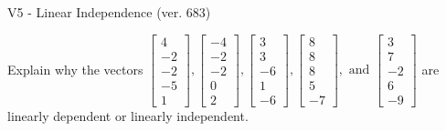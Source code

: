 \begin{exercise}
  \begin{exerciseTitle}V5 - Linear Independence (ver. 683)\end{exerciseTitle}
  \begin{exerciseStatement}
    Explain why the vectors \(\left[\begin{array}{r}
4 \\
-2 \\
-2 \\
-5 \\
1
\end{array}\right] , \left[\begin{array}{r}
-4 \\
-2 \\
-2 \\
0 \\
2
\end{array}\right] , \left[\begin{array}{r}
3 \\
3 \\
-6 \\
1 \\
-6
\end{array}\right] , \left[\begin{array}{r}
8 \\
8 \\
8 \\
5 \\
-7
\end{array}\right] , \text{ and } \left[\begin{array}{r}
3 \\
7 \\
-2 \\
6 \\
-9
\end{array}\right]\) are linearly dependent or linearly independent.	



\end{exerciseStatement}
\end{exercise}
